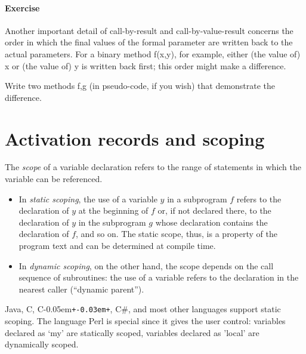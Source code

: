 \documentclass{article}
\newcommand{\Cpp}{C\kern-0.05em\texttt{+\kern-0.03em+}}
\newcommand{\mycomment}[1]{}
\newcommand{\percent}[1]{\protect \marginpar[l]{\bf [#1 points]}}
\newcounter{question}
\newenvironment{question}[1]{
  \addtocounter{question}{1}
  \paragraph{Exercise~\arabic{question}  \percent{#1}}
}{
  \vfil
}
\begin{document}

\begin{question}{X}{
Another important detail of call-by-result and call-by-value-result concerns
the order in which the final values of the formal parameter are written back
to the actual parameters. For a binary method \textsf{f(x,y)}, for
example, either (the value of) \textsf{x} or (the value of) 
\textsf{y} is written back
first; this order might make a difference. 

Write two methods \textsf{f,g} (in pseudo-code,
if you wish) that demonstrate the difference.
\end{question}


\section{Activation records and scoping \percent{25}}
The \textit{scope} of a variable declaration refers to the range of
statements in which the variable can be referenced. 
\begin{itemize}
\item In \textit{static scoping}, the use of a variable $y$ in
a subprogram $f$ refers to the declaration of $y$ at the beginning of $f$ 
or, if not
declared there, to the declaration of $y$ in the subprogram $g$ 
whose declaration
contains the declaration of $f$, and so on. The static scope, thus,
is a property of the program text and can be determined at compile time.
\item In \textit{dynamic scoping}, on the other hand, 
the scope depends on the call sequence of
subroutines: the use of a variable refers to the declaration in 
the nearest caller (``dynamic parent'').
\end{itemize}
Java, C, \Cpp, C\#, and most other
 languages support static scoping. The language Perl is special
since it gives the user control: 
variables declared as \textsf{`my'} are statically scoped, 
variables declared as \textsf{'local'} are dynamically scoped.  

\mycomment{
In this exercise, the question is: given a particular  use of
a variable, how does the run-time system know which declaration that 
variable refers to? As discussed in class, activation records contain
only two kinds of internal information: the return address and the previous
activation record. This does not suffice for languages with
static scoping and \textit{non-local variable references}.
}
\end{document}

